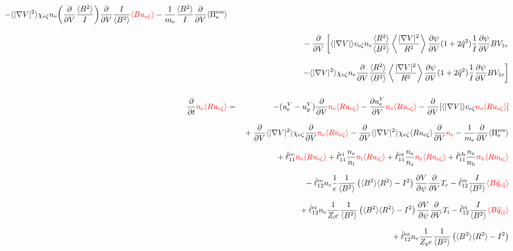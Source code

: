 \documentclass[11pt]{article}
\def\r#1{{\rm#1}}
\def\ave#1{\left\langle#1\right\rangle}
\def\aves#1{\langle#1\rangle}
\def\dd#1#2{\frac{\partial #1}{\partial #2}}
\def\para{\parallel}
\def\ddV{\frac{\partial}{\partial V}}
\def\ddt{\frac{\partial}{\partial t}}
\def\me{m_\r{e}}
\def\nee{n_\r{e}}
\def\ni{n_\r{i}}
\def\nz{n_\r{z}}
\def\nb{n_\r{b}}
\def\Te{T_\r{e}}
\def\Ti{T_\r{i}}
\def\Zi{Z_\r{i}}
\def\Zz{Z_\r{z}}
\def\uzt#1{u_{\r{#1}\zeta}}
\def\upara#1{u_{\r{#1}\para}}
\def\qhatpara#1{\hat{q}_{\r{#1}\para}}
\def\uV#1{u_\r{#1}^V}
\def\ugV{u_{g}^V}
\def\chis#1{\chi_\r{#1}}
\def\bri{\aves{B^2}\aves{R^2} - I^2}
\def\red#1{\textcolor{red}{#1}}
\begin{document}
\begin{eqnarray}
%
  - \aves{|\nabla V|^2} \chis{e\zeta} \nee \biggl( \ddV
  \frac{\aves{B^2}}{I} \biggr) \ddV \frac{I}{\aves{B^2}} \red{\aves{B \upara{e}}}
%
  - \frac{1}{\me} \frac{\aves{B^2}}{I} \ddV \aves{\Pi_\r{e}^\r{res}}
\nonumber\\[3mm]&&{}
%
  - \ddV
    \left[  \aves{|\nabla V|} v_{\r{e}\zeta} \nee
            \frac{\aves{R^2}}{\aves{B^2}}\ave{\frac{|\nabla V|^2}{R^2}}\dd{\psi}{V}(1+2\hat{q}^2)
	    \frac{1}{I} \dd{\psi}{V} BV_{1\r{e}} \right.
\nonumber\\[3mm]&&{}
    \left.- \aves{|\nabla V|^2} \chis{e\zeta} \nee
          \ddV \frac{\aves{R^2}}{\aves{B^2}}\ave{\frac{|\nabla V|^2}{R^2}}\dd{\psi}{V}(1+2\hat{q}^2)
	  \frac{1}{I} \dd{\psi}{V} BV_{1\r{e}}\right]
\\[5mm]
 \ddt \red{\nee \aves{R \uzt{e}}} &=&
%
  - (\uV{e} - \ugV) \ddV \red{\nee \aves{R \uzt{e}}}
%
  - \dd{\uV{e}}{V} \red{\nee \aves{R \uzt{e}}}
%
  - \ddV [\aves{|\nabla V|} v_{\r{e}\zeta} \red{\nee \aves{R \uzt{e}}}]
\nonumber\\[3mm]&&{}
  + \ddV \aves{|\nabla V|^2} \chis{e\zeta} \ddV \red{\nee \aves{R \uzt{e}}}
  - \ddV \aves{|\nabla V|^2} \chis{e\zeta} \aves{R \uzt{e}} \ddV \red{\nee}
  - \frac{1}{\me} \ddV \aves{\Pi_\r{e}^\r{res}}
\nonumber\\[2.5mm]&&{}
%
  + \hat{\ell}_{11}^\r{ee}                  \red{\nee \aves{R \uzt{e}}}
  + \hat{\ell}_{11}^\r{ei} \frac{\nee}{\ni} \red{\ni  \aves{R \uzt{i}}}
  + \hat{\ell}_{11}^\r{ez} \frac{\nee}{\nz} \red{\nz  \aves{R \uzt{z}}}
  + \hat{\ell}_{11}^\r{eb} \frac{\nee}{\nb} \red{\nb  \aves{R \uzt{b}}}
\nonumber\\[2.5mm]&&{}
%
  - \hat{\ell}_{12}^\r{ee} \nee \frac{1}{e} \frac{1}{\aves{B^2}} \left( \bri \right)
    \dd{V}{\psi} \ddV \Te
  - \hat{\ell}_{12}^\r{ee} \frac{I}{\aves{B^2}} \red{\aves{B \qhatpara{e}}}
\nonumber\\[2.5mm]&&{}
  + \hat{\ell}_{12}^\r{ei} \nee \frac{1}{\Zi e} \frac{1}{\aves{B^2}} \left( \bri \right)
    \dd{V}{\psi} \ddV \Ti
  - \hat{\ell}_{12}^\r{ei} \frac{I}{\aves{B^2}} \red{\aves{B \qhatpara{i}}}
\nonumber\\[2.5mm]&&{}
  + \hat{\ell}_{12}^\r{ez} \nee \frac{1}{\Zz e} \frac{1}{\aves{B^2}} \left( \bri \right)

\end{eqnarray}
\end{document}
